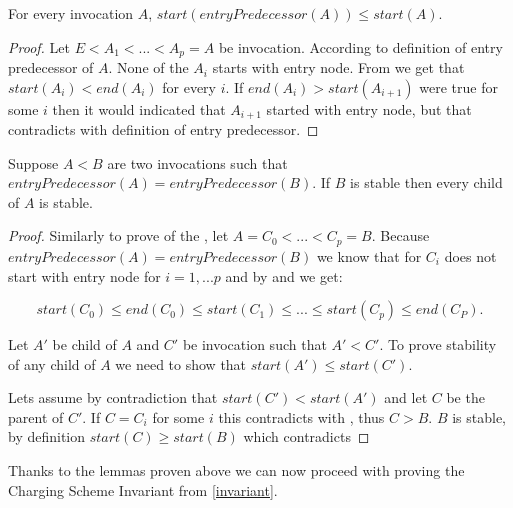 \begin{lemma}
\label{dontknow}
For every invocation $A$, $start(entryPredecessor(A)) \leq start(A)$.
\end{lemma}

\begin{proof}
Let $E < A_1 <...<A_p = A$ be invocation. According to definition of entry predecessor of $A$. None of the $A_i$ starts with entry node. From  we get that $start(A_i) < end(A_i)$ for every $i$. If $end(A_i) > start(A_{i+1})$ were true for some $i$ then it would indicated that $A_{i+1}$ started with entry node, but that contradicts with definition of entry predecessor.
\end{proof}

\begin{lemma}
\label{stable child}
Suppose $A<B$ are two invocations such that $entryPredecessor(A)=entryPredecessor(B)$. If $B$ is stable then every child of $A$ is stable.
\end{lemma}

\begin{proof}
Similarly to prove of the , let $A = C_0 < ... < C_p = B$. Because $entryPredecessor(A)=entryPredecessor(B)$ we know that for $C_i$ does not start with entry node for $i= 1,... p$ and by  and  we get:
    
\begin{equation}
\label{eq}
          start(C_0) \leq end(C_0) \leq start(C_1) \leq ... \leq start(C_p) \leq end(C_P).
\end{equation}
        
Let $A'$ be child of $A$ and $C'$ be invocation such that $A' < C'$. To prove stability of any child of $A$ we need to show that $start(A')  \leq start(C')$.
    
Lets assume by contradiction that $start(C') < start(A')$ and let $C$ be the parent of $C'$. If $C = C_i$ for some $i$ this contradicts with , thus $C > B$. $B$ is stable, by definition $start(C) \geq start(B)$ which contradicts  
\end{proof}


Thanks to the lemmas proven above we can now proceed with proving the Charging Scheme Invariant from \cref{invariant}.

